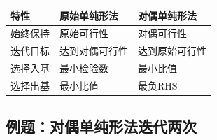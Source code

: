 \begin{notebox}[对偶单纯形法与原始单纯形法的对比]
\begin{table}[H]
\centering
\begin{tabular}{@{}lll@{}}
\toprule
\textbf{特性} & \textbf{原始单纯形法} & \textbf{对偶单纯形法} \\
\midrule
始终保持 & 原始可行性 & 对偶可行性 \\
迭代目标 & 达到对偶可行性 & 达到原始可行性 \\
选择入基 & 最小检验数 & 最小比值 \\
选择出基 & 最小比值 & 最负RHS \\
\bottomrule
\end{tabular}
\end{table}
\end{notebox}

\subsection{例题：对偶单纯形法迭代两次}

